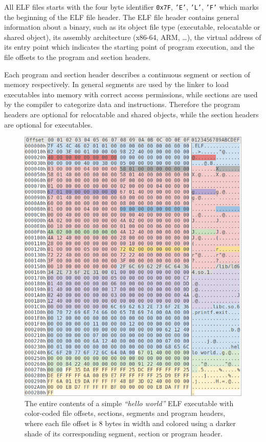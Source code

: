\documentclass[12pt, a4paper]{article}
\begin{document}
All ELF files starts with the four byte identifier \texttt{0x7F}, \texttt{'E'}, \texttt{'L'}, \texttt{'F'} which marks the beginning of the ELF file header. The ELF file header contains general information about a binary, such as its object file type (executable, relocatable or shared object), its assembly architecture (x86-64, ARM, …), the virtual address of its entry point which indicates the starting point of program execution, and the file offsets to the program and section headers.

Each program and section header describes a continuous segment or section of memory respectively. In general segments are used by the linker to load executables into memory with correct access permissions, while sections are used by the compiler to categorize data and instructions. Therefore the program headers are optional for relocatable and shared objects, while the section headers are optional for executables.

\begin{figure}[htbp]
	\begin{center}
		\includegraphics[width=\textwidth]{inc/elf_dissection.png}
		\caption{The entire contents of a simple \textit{``hello world''} ELF executable with color-coded file offsets, sections, segments and program headers, where each file offset is 8 bytes in width and colored using a darker shade of its corresponding segment, section or program header.}
		\label{elf_dissection}
	\end{center}
\end{figure}
\end{document}
